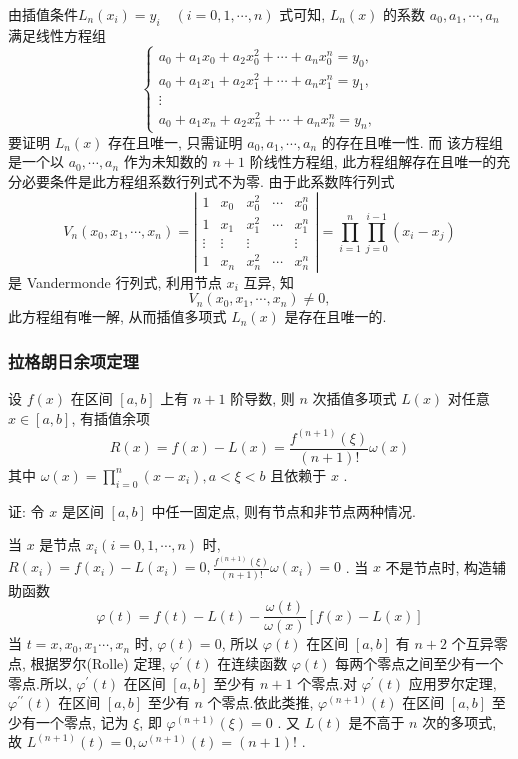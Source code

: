 由插值条件$
L_{n}\left(x_{i}\right)=y_{i} \quad(i=0,1, \cdots, n) 
$ 式可知, $ L_{n}(x) $ 的系数 $ a_{0}, a_{1}, \cdots, a_{n} $ 满足线性方程组
$$ \left\{\begin{array}{c}a_{0}+a_{1} x_{0}+a_{2} x_{0}^{2}+\cdots+a_{n} x_{0}^{n}=y_{0}, \\ a_{0}+a_{1} x_{1}+a_{2} x_{1}^{2}+\cdots+a_{n} x_{1}^{n}=y_{1}, \\ \vdots \\ a_{0}+a_{1} x_{n}+a_{2} x_{n}^{2}+\cdots+a_{n} x_{n}^{n}=y_{n},\end{array}\right. $$
要证明 $ L_{n}(x) $ 存在且唯一, 只需证明 $ a_{0}, a_{1}, \cdots, a_{n} $ 的存在且唯一性. 而 该方程组是一个以 $ a_{0}, \cdots, a_{n} $ 作为未知数的 $ n+1 $ 阶线性方程组, 此方程组解存在且唯一的充分必要条件是此方程组系数行列式不为零. 由于此系数阵行列式
$$
V_{n}\left(x_{0}, x_{1}, \cdots, x_{n}\right)=\left|\begin{array}{ccccc}
1 & x_{0} & x_{0}^{2} & \cdots & x_{0}^{n} \\
1 & x_{1} & x_{1}^{2} & \cdots & x_{1}^{n} \\
\vdots & \vdots & \vdots & & \vdots \\
1 & x_{n} & x_{n}^{2} & \cdots & x_{n}^{n}
\end{array}\right|=\prod_{i=1}^{n} \prod_{j=0}^{i-1}\left(x_{i}-x_{j}\right)
$$
是 Vandermonde 行列式, 利用节点 $ x_{i} $ 互异, 知
$$
V_{n}\left(x_{0}, x_{1}, \cdots, x_{n}\right) \neq 0,
$$
此方程组有唯一解, 从而插值多项式 $ L_{n}(x) $ 是存在且唯一的.

\subsubsection{拉格朗日余项定理}
\begin{tcolorbox}[enhanced,colback=2,colframe=1,breakable,coltitle=black,title=定理]
 设 $ f(x) $ 在区间 $ [a, b] $ 上有 $ n+1 $ 阶导数, 则 $ n $ 次插值多项式 $ L(x) $ 对任意 $ x \in[a, b] $, 有插值余项
$$
R(x)=f(x)-L(x)=\frac{f^{(n+1)}(\xi)}{(n+1)!} \omega(x)
$$
其中 $ \omega(x)=\prod_{i=0}^{n}\left(x-x_{i}\right), a<\xi<b $ 且依赖于 $ x $ .
\end{tcolorbox}
证: 令 $ x $ 是区间 $ [a, b] $ 中任一固定点, 则有节点和非节点两种情况.

当 $ x $ 是节点 $ x_{i}(i=0,1, \cdots, n) $ 时, $ R\left(x_{i}\right)=f\left(x_{i}\right)-L\left(x_{i}\right)=0, \frac{f^{(n+1)}(\xi)}{(n+1)!} \omega\left(x_{i}\right)=0 $ .
当 $ x $ 不是节点时, 构造辅助函数
$$
\varphi(t)=f(t)-L(t)-\frac{\omega(t)}{\omega(x)}[f(x)-L(x)]
$$
当 $ t=x, x_{0}, x_{1} \cdots, x_{n} $ 时, $ \varphi(t)=0 $, 所以 $ \varphi(t) $ 在区间 $ [a, b] $ 有 $ n+2 $ 个互异零点, 根据罗尔(Rolle) 定理, $ \varphi^{\prime}(t) $ 在连续函数 $ \varphi(t) $ 每两个零点之间至少有一个零点.所以, $ \varphi^{\prime}(t) $ 在区间 $ [a, b] $ 至少有 $ n+1 $ 个零点.对 $ \varphi^{\prime}(t) $ 应用罗尔定理, $ \varphi^{\prime \prime}(t) $ 在区间 $ [a, b] $ 至少有 $ n $ 个零点.依此类推, $ \varphi^{(n+1)}(t) $ 在区间 $ [a, b] $ 至少有一个零点, 记为 $ \xi $, 即 $ \varphi^{(n+1)}(\xi)=0 $ .
又 $ L(t) $ 是不高于 $ n $ 次的多项式, 故 $ L^{(n+1)}(t)=0, \omega^{(n+1)}(t)=(n+1)! $ .

